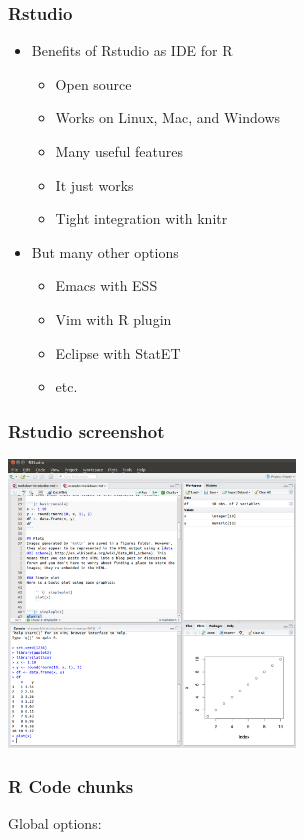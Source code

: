 \begin{frame}\frametitle{Rstudio}

\begin{itemize}
\item
  Benefits of Rstudio as IDE for R

  \begin{itemize}
  \item
    Open source
  \item
    Works on Linux, Mac, and Windows
  \item
    Many useful features
  \item
    It just works
  \item
    Tight integration with knitr
  \end{itemize}
\item
  But many other options

  \begin{itemize}
  \item
    Emacs with ESS
  \item
    Vim with R plugin
  \item
    Eclipse with StatET
  \item
    etc.
  \end{itemize}
\end{itemize}

\end{frame}

\begin{frame}\frametitle{Rstudio screenshot}

\includegraphics[width=3in]{figures/rstudio-screenshot.png}

\end{frame}

\begin{frame}\frametitle{R Code chunks}

Global options:

\end{frame}

